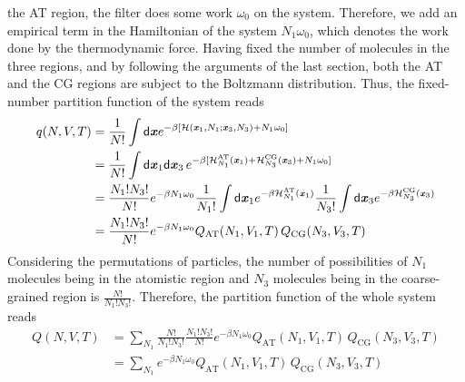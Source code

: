 \documentclass[aip,jcp,a4paper,reprint,onecolumn]{revtex4-1}
\newcommand{\recheck}[1]{{\color{red} #1}}
\newcommand{\vect}[1]{\textbf{\textit{#1}}}
\newcommand{\dd}[1]{\textsf{#1}}
\newcommand{\AT}{{\textrm{{AT}}}}
\newcommand{\CG}{{\textrm{CG}}}
\begin{document}
the AT region, the filter does some work $\omega_0$ on the system.
Therefore, we add an empirical term in the Hamiltonian of the system
$N_1\omega_0$, which denotes the work done by the thermodynamic force.
Having fixed the number of molecules in the three regions, and by following the
arguments of the last section, both the AT and the CG regions are
subject to the Boltzmann distribution.
Thus, the fixed-number partition function of the system reads
\begin{align}\nonumber
  q(N,V,T)
  &= \frac1{N!}\int
  \dd d\vect x
  e^{-\beta
    [\mathcal H(\vect x_1, N_1; \vect x_3, N_3) +
    N_1\omega_0]}\\\nonumber
  &= \frac1{N!}\int
  \dd d\vect x_1\dd d\vect x_3\,
  e^{-\beta
    [\mathcal H_{N_1}^{\AT}(\vect x_1) +
    \mathcal H_{N_3}^{\CG}(\vect x_3) +
    N_1\omega_0]}\\\nonumber
  & = \frac{N_1!N_3!}{N!}
  e^{-\beta N_1\omega_0}
  \frac{1}{N_1!}\int\dd d\vect x_1 e^{-\beta\mathcal H_{N_1}^{\AT}(\vect x_1)}
  \frac{1}{N_3!}\int\dd d\vect x_3 e^{-\beta\mathcal H_{N_3}^{\CG}(\vect x_3)}\\
  & = \frac{N_1!N_3!}{N!}
  e^{-\beta N_1\omega_0}
  Q_{\AT}(N_1, V_1, T)\,
  Q_{\CG}(N_3, V_3, T) 
\end{align}
Considering the permutations of particles, the number of possibilities of
$N_1$ molecules being in the atomistic region and $N_3$ molecules being
in the coarse-grained region is  $\frac{N!}{N_1!N_3!}$.
Therefore, the partition function of the whole system reads
\begin{align}\nonumber
  Q(N,V,T) &= \sum_{N_1}
  \frac{N!}{N_1!N_3!} \frac{N_1!N_3!}{N!}
  e^{-\beta N_1\omega_0}
  Q_{\AT}(N_1, V_1, T)\,
  Q_{\CG}(N_3, V_3, T) \\
  &= \sum_{N_1}
  e^{-\beta N_1\omega_0}
  Q_{\AT}(N_1, V_1, T)\,
  Q_{\CG}(N_3, V_3, T) 
\end{align}
\end{document}

